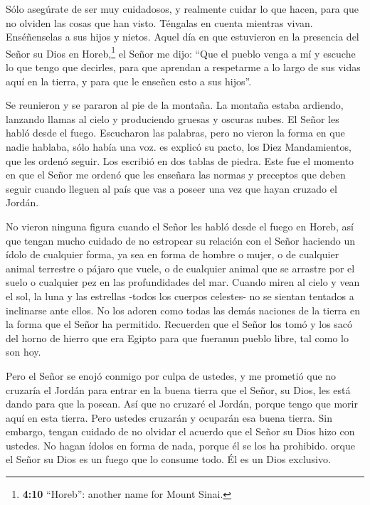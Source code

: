  Sólo asegúrate de ser muy cuidadosos, y realmente cuidar lo
que hacen, para que no olviden las cosas que han visto. Téngalas en
cuenta mientras vivan. Enséñenselas a sus hijos y nietos. 
Aquel día en que estuvieron en la presencia del Señor su Dios en
Horeb,\footnote{\textbf{4:10} ``Horeb'': another name for Mount Sinai.}
el Señor me dijo: ``Que el pueblo venga a mí y escuche lo que tengo que
decirles, para que aprendan a respetarme a lo largo de sus vidas aquí en
la tierra, y para que le enseñen esto a sus hijos''.

 Se reunieron y se pararon al pie de la montaña. La montaña
estaba ardiendo, lanzando llamas al cielo y produciendo gruesas y
oscuras nubes.  El Señor les habló desde el fuego.
Escucharon las palabras, pero no vieron la forma en que nadie hablaba,
sólo había una voz.  es explicó su pacto, los Diez
Mandamientos, que les ordenó seguir. Los escribió en dos tablas de
piedra.  Este fue el momento en que el Señor me ordenó que
les enseñara las normas y preceptos que deben seguir cuando lleguen al
país que vas a poseer una vez que hayan cruzado el Jordán.

 No vieron ninguna figura cuando el Señor les habló desde
el fuego en Horeb, así que tengan mucho cuidado  de no
estropear su relación con el Señor haciendo un ídolo de cualquier forma,
ya sea en forma de hombre o mujer,  o de cualquier animal
terrestre o pájaro que vuele,  o de cualquier animal que se
arrastre por el suelo o cualquier pez en las profundidades del mar.
 Cuando miren al cielo y vean el sol, la luna y las
estrellas -todos los cuerpos celestes- no se sientan tentados a
inclinarse ante ellos. No los adoren como todas las demás naciones de la
tierra en la forma que el Señor ha permitido.  Recuerden
que el Señor los tomó y los sacó del horno de hierro que era Egipto para
que fueranun pueblo libre, tal como lo son hoy.

 Pero el Señor se enojó conmigo por culpa de ustedes, y me
prometió que no cruzaría el Jordán para entrar en la buena tierra que el
Señor, su Dios, les está dando para que la posean.  Así que
no cruzaré el Jordán, porque tengo que morir aquí en esta tierra. Pero
ustedes cruzarán y ocuparán esa buena tierra.  Sin embargo,
tengan cuidado de no olvidar el acuerdo que el Señor su Dios hizo con
ustedes. No hagan ídolos en forma de nada, porque él se los ha
prohibido.  orque el Señor su Dios es un fuego que lo
consume todo. Él es un Dios exclusivo.

